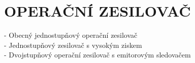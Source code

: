\section{OPERAČNÍ ZESILOVAČ}
- Obecný jednostupňový operační zesilovač\\
- Jednostupňový zesilovač s vysokým ziskem\\
- Dvojstupňový operační zesilovač s emitorovým sledovačem\\